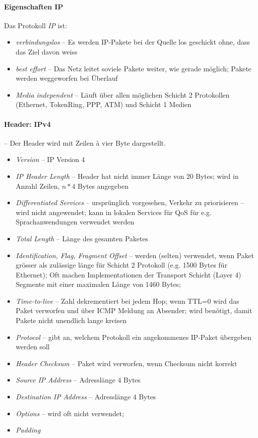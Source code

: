 \documentclass[a4paper,12pt]{article}
\begin{document}
\paragraph{Eigenschaften IP}
Das Protokoll \emph{IP} ist:
\begin{itemize}
\item \emph{verbindungslos} -- Es werden IP-Pakete bei der Quelle los geschickt ohne, dass das Ziel davon weiss
\item \emph{best effort} -- Das Netz leitet soviele Pakete weiter, wie gerade möglich; Pakete werden weggeworfen bei Überlauf
\item \emph{Media independent} -- Läuft über allen möglichen Schicht 2 Protokollen (Ethernet, TokenRing, PPP, ATM) und Schicht 1 Medien
\end{itemize}



\paragraph{Header: IPv4} -- Der Header wird mit Zeilen à vier Byte dargestellt.

\begin{itemize}
\item \emph{Version} -- IP Version 4
\item \emph{IP Header Length} -- Header hat nicht immer Länge von 20 Bytes; wird in Anzahl Zeilen, $n*4$ Bytes angegeben
\item \emph{Differentiated Services} -- ursprünglich vorgesehen, Verkehr zu priorisieren -- wird nicht angewendet; kann in lokalen Services für QoS für e.g. Sprachanwendungen verwendet werden
\item \emph{Total Length} -- Länge des gesamten Paketes
\item \emph{Identification, Flag, Fragment Offset} -- werden (selten) verwendet, wenn Paket grösser als zulässige länge für Schicht 2 Protokoll (e.g. 1500 Bytes für Ethernet); Oft machen Implementationen der Transport Schicht (Layer 4) Segmente mit einer maximalen Länge von 1460 Bytes;
\item \emph{Time-to-live} -- Zahl dekrementiert bei jedem Hop; wenn TTL=0 wird das Paket verworfen und über ICMP Meldung an Absender; wird benötigt, damit Pakete nicht unendlich lange kreisen
\item \emph{Protocol} -- gibt an, welchem Protokoll ein angekommenes IP-Paket übergeben werden soll
\item \emph{Header Checksum} -- Paket wird verworfen, wenn Checksum nicht korrekt
\item \emph{Source IP Address} -- Adresslänge 4 Bytes
\item \emph{Destination IP Address} -- Adresslänge 4 Bytes
\item \emph{Options} -- wird oft nicht verwendet;
\item \emph{Padding} 
\end{itemize}
\end{document}
